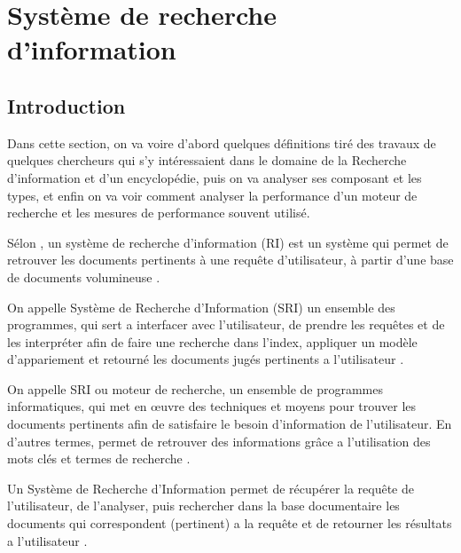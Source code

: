 \section{Système de recherche d'information}
\subsection{Introduction}
Dans cette section, on va voire d'abord quelques définitions tiré des travaux de quelques chercheurs qui s'y intéressaient dans le domaine de la Recherche d'information et d'un encyclopédie, puis on va analyser ses composant et les types, et enfin on va voir comment analyser la performance d'un moteur de recherche et les mesures de performance souvent utilisé.

\begin{definition}
    Sélon \citeauthor{salton1989automatique}, un système de recherche d'information (RI) est un système qui permet de retrouver les documents pertinents à une requête d'utilisateur, à partir d'une base de documents volumineuse \citep{salton1989automatique}.
\end{definition}

\begin{definition}
	On appelle Système de Recherche d'Information (SRI) un ensemble des programmes, qui sert a interfacer avec l'utilisateur, de prendre les requêtes et de les interpréter afin de faire une recherche dans l'index, appliquer un modèle d’appariement et retourné les documents jugés pertinents a l'utilisateur \citep{amelioration-ri-approche-semantique}.
\end{definition}

\begin{definition}
	On appelle SRI ou moteur de recherche, un ensemble de programmes informatiques, qui met en œuvre des techniques et moyens pour trouver les documents pertinents afin de satisfaire le besoin d'information de l'utilisateur. En d'autres termes, permet de retrouver des informations grâce a l'utilisation des mots clés et termes de recherche \citep{approche-semantique}.
\end{definition}

\begin{definition}
	Un Système de Recherche d'Information permet de récupérer la requête de l'utilisateur, de l'analyser, puis rechercher dans la base documentaire les documents qui correspondent (pertinent) a la requête et de retourner les résultats a l'utilisateur \citep{vsm}.
\end{definition}

